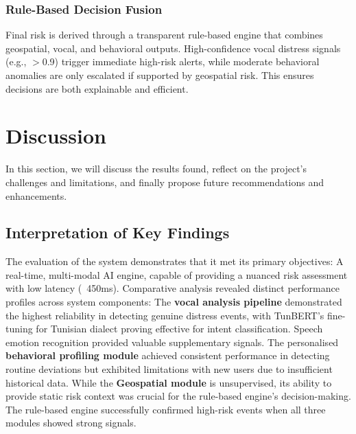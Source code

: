 \documentclass[12pt,a4paper,oneside,english]{book}
\begin{document}
\subsubsection{Rule-Based Decision Fusion}
Final risk is derived through a transparent rule-based engine that combines geospatial, vocal, and behavioral outputs. High-confidence vocal distress signals (e.g., $>$0.9) trigger immediate high-risk alerts, while moderate behavioral anomalies are only escalated if supported by geospatial risk. This ensures decisions are both explainable and efficient.


\section{Discussion}
\label{sec:discussion}
In this section, we will discuss the results found, reflect on the project's challenges and limitations, and finally propose future recommendations and enhancements.

    \subsection{Interpretation of Key Findings}
    \label{subsec:interpretation}
    
The evaluation of the system demonstrates that it met its primary objectives: A real-time, multi-modal AI engine, capable of providing a nuanced risk assessment with low latency (~450ms). 
Comparative analysis revealed distinct performance profiles across system components: The \textbf{vocal analysis pipeline} demonstrated the highest reliability in detecting genuine distress events, with TunBERT's fine-tuning for Tunisian dialect proving effective for intent classification. Speech emotion recognition provided valuable supplementary signals. 
The personalised \textbf{behavioral profiling module} achieved consistent performance in detecting routine deviations but exhibited limitations with new users due to insufficient historical data.
While the \textbf{Geospatial module} is unsupervised, its ability to provide static risk context was crucial for the rule-based engine's decision-making.
The rule-based engine successfully confirmed high-risk events when all three modules showed strong signals.
\end{document}

